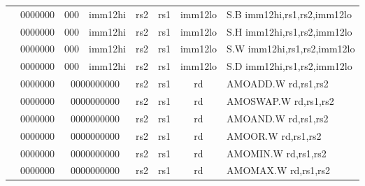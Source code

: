 \begin{table}[p]
\begin{small}
\begin{center}
\begin{tabular}{rcccccccccl}
&
\multicolumn{1}{|c|}{0000000} &
\multicolumn{2}{c|}{000} &
\multicolumn{3}{c|}{imm12hi} &
\multicolumn{1}{c|}{rs2} &
\multicolumn{1}{c|}{rs1} &
\multicolumn{1}{c|}{imm12lo} & S.B imm12hi,rs1,rs2,imm12lo \\
\cline{2-10}
  

&
\multicolumn{1}{|c|}{0000000} &
\multicolumn{2}{c|}{000} &
\multicolumn{3}{c|}{imm12hi} &
\multicolumn{1}{c|}{rs2} &
\multicolumn{1}{c|}{rs1} &
\multicolumn{1}{c|}{imm12lo} & S.H imm12hi,rs1,rs2,imm12lo \\
\cline{2-10}
  

&
\multicolumn{1}{|c|}{0000000} &
\multicolumn{2}{c|}{000} &
\multicolumn{3}{c|}{imm12hi} &
\multicolumn{1}{c|}{rs2} &
\multicolumn{1}{c|}{rs1} &
\multicolumn{1}{c|}{imm12lo} & S.W imm12hi,rs1,rs2,imm12lo \\
\cline{2-10}
  

&
\multicolumn{1}{|c|}{0000000} &
\multicolumn{2}{c|}{000} &
\multicolumn{3}{c|}{imm12hi} &
\multicolumn{1}{c|}{rs2} &
\multicolumn{1}{c|}{rs1} &
\multicolumn{1}{c|}{imm12lo} & S.D imm12hi,rs1,rs2,imm12lo \\
\cline{2-10}
  

&
\multicolumn{1}{|c|}{0000000} &
\multicolumn{5}{c|}{0000000000} &
\multicolumn{1}{c|}{rs2} &
\multicolumn{1}{c|}{rs1} &
\multicolumn{1}{c|}{rd} & AMOADD.W rd,rs1,rs2 \\
\cline{2-10}
  

&
\multicolumn{1}{|c|}{0000000} &
\multicolumn{5}{c|}{0000000000} &
\multicolumn{1}{c|}{rs2} &
\multicolumn{1}{c|}{rs1} &
\multicolumn{1}{c|}{rd} & AMOSWAP.W rd,rs1,rs2 \\
\cline{2-10}
  

&
\multicolumn{1}{|c|}{0000000} &
\multicolumn{5}{c|}{0000000000} &
\multicolumn{1}{c|}{rs2} &
\multicolumn{1}{c|}{rs1} &
\multicolumn{1}{c|}{rd} & AMOAND.W rd,rs1,rs2 \\
\cline{2-10}
  

&
\multicolumn{1}{|c|}{0000000} &
\multicolumn{5}{c|}{0000000000} &
\multicolumn{1}{c|}{rs2} &
\multicolumn{1}{c|}{rs1} &
\multicolumn{1}{c|}{rd} & AMOOR.W rd,rs1,rs2 \\
\cline{2-10}
  

&
\multicolumn{1}{|c|}{0000000} &
\multicolumn{5}{c|}{0000000000} &
\multicolumn{1}{c|}{rs2} &
\multicolumn{1}{c|}{rs1} &
\multicolumn{1}{c|}{rd} & AMOMIN.W rd,rs1,rs2 \\
\cline{2-10}
  

&
\multicolumn{1}{|c|}{0000000} &
\multicolumn{5}{c|}{0000000000} &
\multicolumn{1}{c|}{rs2} &
\multicolumn{1}{c|}{rs1} &
\multicolumn{1}{c|}{rd} & AMOMAX.W rd,rs1,rs2 \\
\cline{2-10}
  


\end{tabular}
\end{center}
\end{small}
\end{table}

